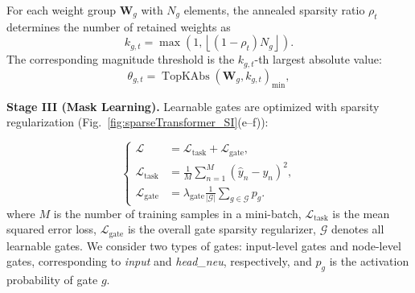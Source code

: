 \documentclass[11pt]{article}
\begin{document}
For each weight group $\mathbf{W}_g$ with $N_g$ elements, the annealed sparsity ratio $\rho_t$ determines the number of retained weights as
\begin{equation}
    k_{g,t}=\max\left(1,\left\lfloor(1-\rho_t)N_g\right\rfloor\right).
\end{equation}
The corresponding magnitude threshold is the $k_{g,t}$-th largest absolute value:
\begin{equation}
    \theta_{g,t}=\operatorname{TopKAbs}(\mathbf{W}_g, k_{g,t})_{\min},
\end{equation}

\textbf{Stage III (Mask Learning).}
Learnable gates are optimized with sparsity regularization (Fig.~\ref{fig:sparseTransformer_SI}(e--f))\cite{NEURIPS2019_1113d7a7}:

\begin{equation}
\left\{
\begin{aligned}
\mathcal{L} &= \mathcal{L}_{\mathrm{task}}+\mathcal{L}_{\mathrm{gate}}, \\
\mathcal{L}_{\mathrm{task}} &= \frac{1}{M}\sum_{n=1}^{M}(\hat{y}_n-y_n)^2, \\
\mathcal{L}_{\mathrm{gate}} &= \lambda_{\mathrm{gate}}\frac{1}{|\mathcal{G}|}\sum_{g\in\mathcal{G}} p_g.
\end{aligned}
\right.
\end{equation}
where $M$ is the number of training samples in a mini-batch, $\mathcal{L}_{\mathrm{task}}$ is the mean squared error loss, $\mathcal{L}_{\mathrm{gate}}$ is the overall gate sparsity regularizer, $\mathcal{G}$ denotes all learnable gates. We consider two types of gates: input-level gates and node-level gates, corresponding to \textit{input} and \textit{head\_neu}, respectively, and $p_g$ is the activation probability of gate $g$.
\end{document}

